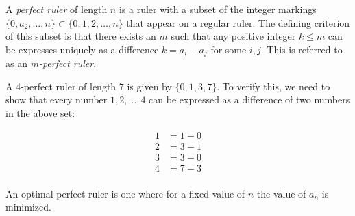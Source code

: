 \documentclass{article}
\begin{document}
A \emph{perfect ruler} of length $n$ is a ruler with a subset of the integer markings  $\{0,a_2,\ldots,n\}\subset\{0,1,2,\ldots,n\}$ that appear on a regular ruler.  The defining criterion of this subset is that there exists an $m$ such that any positive integer $k\leq m$ can be expresses uniquely as a difference $k=a_i-a_j$ for some $i,j$.  This is referred to as an \emph{$m$-perfect ruler}.

A 4-perfect ruler of length $7$ is given by $\{0,1,3,7\}$.  To verify this, we need to show that every number $1,2,\ldots,4$ can be expressed as a difference of two numbers in the above set:

\begin{align*}
1&=1-0\\
2&=3-1\\
3&=3-0\\
4&=7-3\\
\end{align*}

An optimal perfect ruler is one where for a fixed value of $n$ the value of $a_n$ is minimized.
\end{document}
